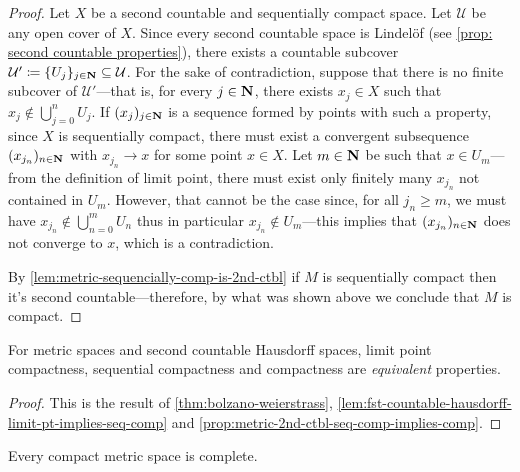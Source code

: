 \begin{proof}
Let \(X\) be a second countable and sequentially compact space. Let
\(\mathcal{U}\) be any open cover of \(X\). Since every second countable space
is Lindel\"{o}f (see \cref{prop: second countable properties}), there exists a
countable subcover
\(\mathcal{U}' \coloneq \{U_j\}_{j \in \mathbf{N}} \subseteq \mathcal{U}\). For the sake
of contradiction, suppose that there is no finite subcover of \(\mathcal{U}'\)---that is, for every \(j \in \mathbf{N}\), there exists \(x_j \in X\) such that
\(x_j \notin \bigcup_{j=0}^n U_j\). If \((x_j)_{j \in \mathbf{N}}\) is a sequence formed
by points with such a property, since \(X\) is sequentially compact, there must
exist a convergent subsequence \((x_{j_n})_{n \in \mathbf{N}}\) with \(x_{j_n} \to x\)
for some point \(x \in X\). Let \(m \in \mathbf{N}\) be such that \(x \in U_m\)---from
the definition of limit point, there must exist only finitely many \(x_{j_n}\)
not contained in \(U_m\). However, that cannot be the case since, for all
\(j_n \geq m\), we must have \(x_{j_n} \notin \bigcup_{n=0}^m U_{n}\) thus in
particular \(x_{j_n} \notin U_m\)---this implies that \((x_{j_n})_{n \in \mathbf{N}}\)
does not converge to \(x\), which is a contradiction.

By \cref{lem:metric-sequencially-comp-is-2nd-ctbl} if \(M\) is sequentially
compact then it's second countable---therefore, by what was shown above we
conclude that \(M\) is compact.
\end{proof}

\begin{theorem}
\label{thm:metric-2d-ctbl-hausdorff-equiv-compactness}
For metric spaces and second countable Hausdorff spaces, limit point
compactness, sequential compactness and compactness are \emph{equivalent}
properties.
\end{theorem}

\begin{proof}
This is the result of \cref{thm:bolzano-weierstrass},
\cref{lem:fst-countable-hausdorff-limit-pt-implies-seq-comp} and
\cref{prop:metric-2nd-ctbl-seq-comp-implies-comp}.
\end{proof}

\begin{corollary}
\label{cor:compact-metric-space-is-complete}
Every compact metric space is complete.
\end{corollary}

